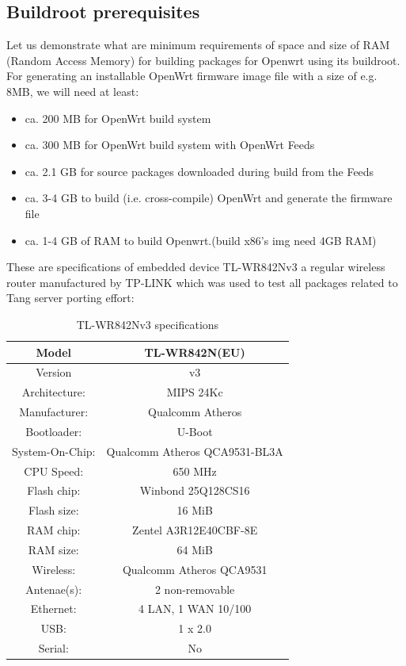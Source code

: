 \subsection{Buildroot prerequisites}

Let us demonstrate what are minimum requirements of space and size of RAM (Random Access Memory) for building packages for Openwrt using its buildroot.
For generating an installable OpenWrt firmware image file with a size of e.g. 8MB, we will need at least:
\begin{itemize}
\item ca. 200 MB for OpenWrt build system
\item ca. 300 MB for OpenWrt build system with OpenWrt Feeds
\item ca. 2.1 GB for source packages downloaded during build from the Feeds
\item ca. 3-4 GB to build (i.e. cross-compile) OpenWrt and generate the firmware file
\item ca. 1-4 GB of RAM to build Openwrt.(build x86's img need 4GB RAM)
\end{itemize}

These are specifications of embedded device TL-WR842Nv3 a regular wireless router manufactured by TP-LINK which was used to test all packages related to Tang server porting effort:

\begin{table}[h]
\centering
\label{routerspec}
\begin{tabular}{c|c}
\hline
Model           &   TL-WR842N(EU)                   \\ \hline
Version         &   v3                              \\ \hline
Architecture:   &   MIPS 24Kc                       \\ \hline
Manufacturer:   &   Qualcomm Atheros                \\ \hline
Bootloader:     &   U-Boot                          \\ \hline
System-On-Chip: &   Qualcomm Atheros QCA9531-BL3A   \\ \hline
CPU Speed:      &   650 MHz                         \\ \hline
Flash chip:     &   Winbond 25Q128CS16              \\ \hline
Flash size:     &   16 MiB                          \\ \hline
RAM chip:       &   Zentel A3R12E40CBF-8E           \\ \hline
RAM size:       &   64 MiB                          \\ \hline
Wireless:       &   Qualcomm Atheros QCA9531        \\ \hline
Antenae(s):     &   2 non-removable                 \\ \hline
Ethernet:       &   4 LAN, 1 WAN 10/100             \\ \hline
USB:            &   1 x 2.0                         \\ \hline
Serial:         &   No                              \\ \hline
\end{tabular}
\caption{TL-WR842Nv3 specifications}
\end{table}

